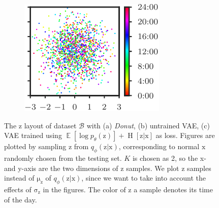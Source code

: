 \documentclass[sigconf]{acmart}
\newcommand{\DONUT}{\textit{Donut}}
\newcommand{\DATASETB}{$\mathcal{B}$}
\newcommand{\vv}[1]{\bm{\mathrm{{#1}}}}
\newcommand{\EE}[1]{\operatorname{\mathbb{E}}\left[{#1}\right]}
\newcommand{\Entropyy}[1]{\operatorname{H}\left[#1\right]}
\begin{document}
\begin{figure}
\begin{subfigure}[t]{0.2675\columnwidth}
		\caption{}\label{fig:z2-latent-space-null}
	\end{subfigure}\hfill
	\begin{subfigure}[t]{0.371\columnwidth}
		\centering
		\includegraphics[width=\columnwidth]{z2_latent_space_spread_out}
		\caption{}\label{fig:z2-latent-space-spread-out}
	\end{subfigure}

	\caption{
		The $\vv{z}$ layout of dataset \DATASETB{} with (a) \DONUT{}, (b) untrained VAE, (c) VAE trained using $\EE{\log p_{\theta}(\vv{z})} + \Entropyy{\vv{z}|\vv{x}}$ as loss.
		Figures are plotted by sampling $\vv{z}$ from $q_{\phi}(\vv{z}|\vv{x})$, corresponding to normal $\vv{x}$ randomly chosen from the testing set.
		$K$ is chosen as 2, so the x- and y-axis are the two dimensions of $\vv{z}$ samples.
		We plot $\vv{z}$ samples instead of $\vv{\mu_z}$ of $q_{\phi}(\vv{z}|\vv{x})$, since we want to take into account the effects of $\vv{\sigma_z}$ in the figures.
		The color of $\vv{z}$ a sample denotes its time of the day.
	}
	\label{fig:z2-latent-space}
\end{figure}
\end{document}
